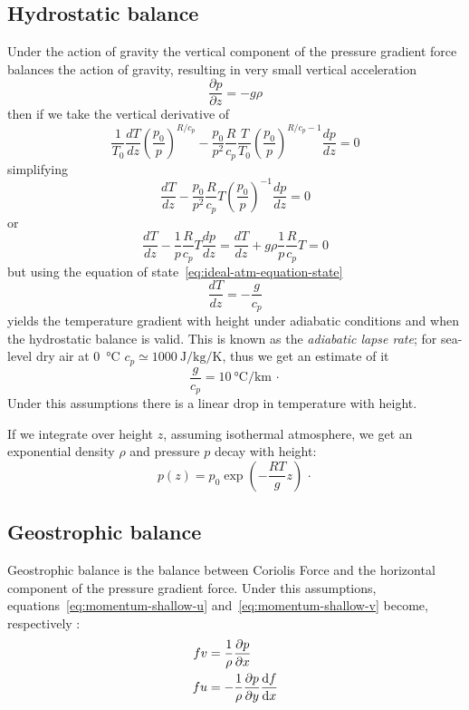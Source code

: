 \subsection{Hydrostatic balance}\label{subsec:hydrostatic-balance}
Under the action of gravity the vertical component of the pressure
gradient force balances the action of gravity, resulting in very small
vertical acceleration
\[
	\frac{\partial p}{\partial z} =  -g \rho
\]
then if we take the vertical derivative of~\eq{\ref{eq:T-T0-adiabatic}}
\[
	\frac{1}{T_0}\frac{d T}{dz}\left(\frac{p_0}{p}\right)^{R/c_p} -\frac{p_0}{p^2}\frac{R}{c_p}\frac{T}{T_0}\left(\frac{p_0}{p}\right)^{R/c_p-1}\frac{d p}{dz} = 0
\]
simplifying
\[
	\frac{d T}{dz} -\frac{p_0}{p^2}\frac{R}{c_p}T\left(\frac{p_0}{p}\right)^{-1}\frac{d p}{dz} = 0
\]
or
\[
	\frac{d T}{dz} -\frac{1}{p}\frac{R}{c_p}T\frac{d p}{dz} = \frac{d T}{dz} +g\rho\frac{1}{p}\frac{R}{c_p}T = 0
\]
but using the equation of state~\ref{eq:ideal-atm-equation-state}
\begin{equation}
	\frac{d T}{dz} = -\frac{g}{c_p}
	\label{eq:adiabatic-lapse-rate}
\end{equation}
yields the temperature gradient with height under adiabatic
conditions and when the hydrostatic balance is valid.
This is known as the \emph{adiabatic lapse rate}; for sea-level dry air at \qty{0}{\celsius} $c_p \simeq \qty{1000}{\joule \per \kilo\gram \per \kelvin}$, thus we
get an estimate of it
\begin{equation}
	\frac{g}{c_p} = \qty{10}{\celsius \per \kilo\meter} \, \cdot
	\label{eq:adiabatic-lapse-rate-value}
\end{equation}
Under this assumptions there is a linear drop in temperature with height.

If we integrate over height $z$, assuming isothermal atmosphere, we get an exponential density $\rho$ and pressure $p$ decay
with height:
\begin{equation}
	p(z)=p_0 \exp{\left(- \frac{RT}{g}z\right)} \, \cdot
	\label{eq:pressure-profile-isothermal-atm}
\end{equation}


\subsection{Geostrophic balance}\label{subsec:geostrophic-balance}
Geostrophic balance is the balance between Coriolis Force and the horizontal component of the pressure gradient force.
Under this assumptions, equations~\ref{eq:momentum-shallow-u} and~\ref{eq:momentum-shallow-v} become, respectively
\citep{Gill1982}:
\begin{align}
	f v & = \frac{1}{\rho} \frac{\partial p}{\partial x}                 \\
	f u & = - \frac{1}{\rho} \frac{\partial p}{\partial y} \frac{\mathrm{d}f}{\mathrm{d}x}
\end{align}

